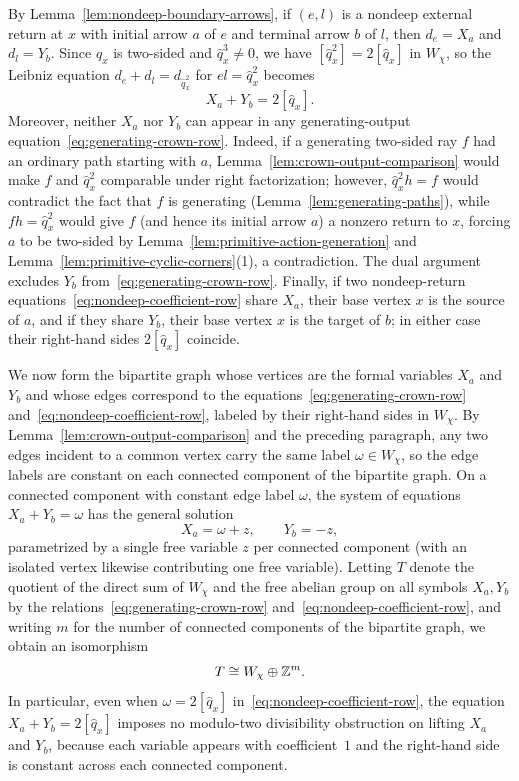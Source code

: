 By Lemma~\ref{lem:nondeep-boundary-arrows}, if $(e,l)$ is a nondeep external return at $x$ with initial arrow $a$ of $e$ and terminal arrow $b$ of $l$, then $d_e=X_a$ and $d_l=Y_b$. Since $\widehat q_x$ is two-sided and $\widehat q_x^3\ne0$, we have $[\widehat q_x^2]=2[\widehat q_x]$ in $W_\chi$, so the Leibniz equation $d_e+d_l=d_{\widehat q_x^2}$ for $el=\widehat q_x^2$ becomes
\begin{equation}
  X_a+Y_b=2[\widehat q_x].
  \label{eq:nondeep-coefficient-row}
\end{equation}
Moreover, neither $X_a$ nor $Y_b$ can appear in any generating-output equation~\eqref{eq:generating-crown-row}. Indeed, if a generating two-sided ray $f$ had an ordinary path starting with $a$, Lemma~\ref{lem:crown-output-comparison} would make $f$ and $\widehat q_x^2$ comparable under right factorization; however, $\widehat q_x^2h=f$ would contradict the fact that $f$ is generating (Lemma~\ref{lem:generating-paths}), while $fh=\widehat q_x^2$ would give $f$ (and hence its initial arrow $a$) a nonzero return to $x$, forcing $a$ to be two-sided by Lemma~\ref{lem:primitive-action-generation} and Lemma~\ref{lem:primitive-cyclic-corners}(1), a contradiction. The dual argument excludes $Y_b$ from~\eqref{eq:generating-crown-row}. Finally, if two nondeep-return equations~\eqref{eq:nondeep-coefficient-row} share $X_a$, their base vertex $x$ is the source of $a$, and if they share $Y_b$, their base vertex $x$ is the target of $b$; in either case their right-hand sides $2[\widehat q_x]$ coincide.

We now form the bipartite graph whose vertices are the formal variables $X_a$ and $Y_b$ and whose edges correspond to the equations~\eqref{eq:generating-crown-row} and~\eqref{eq:nondeep-coefficient-row}, labeled by their right-hand sides in $W_\chi$. By Lemma~\ref{lem:crown-output-comparison} and the preceding paragraph, any two edges incident to a common vertex carry the same label $\omega\in W_\chi$, so the edge labels are constant on each connected component of the bipartite graph. On a connected component with constant edge label $\omega$, the system of equations $X_a+Y_b=\omega$ has the general solution
\[
  X_a=\omega+z,\qquad Y_b=-z,
\]
parametrized by a single free variable $z$ per connected component (with an isolated vertex likewise contributing one free variable). Letting $T$ denote the quotient of the direct sum of $W_\chi$ and the free abelian group on all symbols $X_a,Y_b$ by the relations~\eqref{eq:generating-crown-row} and~\eqref{eq:nondeep-coefficient-row}, and writing $m$ for the number of connected components of the bipartite graph, we obtain an isomorphism
\begin{equation}
  T\cong W_\chi\oplus\mathbb Z^m.
  \label{eq:crown-coefficient-group}
\end{equation}
In particular, even when $\omega=2[\widehat q_x]$ in~\eqref{eq:nondeep-coefficient-row}, the equation $X_a+Y_b=2[\widehat q_x]$ imposes no modulo-two divisibility obstruction on lifting $X_a$ and $Y_b$, because each variable appears with coefficient~$1$ and the right-hand side is constant across each connected component.


